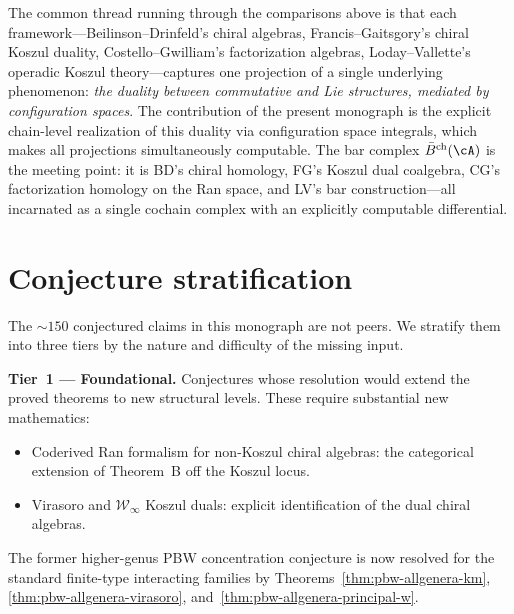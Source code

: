\begin{remark}[Synthesis]\label{rem:concordance-synthesis}
The common thread running through the comparisons above is that each
framework---Beilinson--Drinfeld's chiral algebras, Francis--Gaitsgory's
chiral Koszul duality, Costello--Gwilliam's factorization algebras,
Loday--Vallette's operadic Koszul theory---captures one projection of a
single underlying phenomenon: \emph{the duality between commutative and
Lie structures, mediated by configuration spaces}.  The contribution of
the present monograph is the explicit chain-level realization of this
duality via configuration space integrals, which makes all projections
simultaneously computable.  The bar complex $\bar{B}^{\mathrm{ch}}(\cA)$
is the meeting point: it is BD's chiral homology, FG's Koszul dual
coalgebra, CG's factorization homology on the Ran space, and LV's bar
construction---all incarnated as a single cochain complex with an
explicitly computable differential.
\end{remark}

\section{Conjecture stratification}
\label{sec:conjecture-stratification}

The ${\sim}150$ conjectured claims in this monograph are not peers.
We stratify them into three tiers by the nature and difficulty of
the missing input.

\smallskip\noindent\textbf{Tier~1 --- Foundational.}
Conjectures whose resolution would extend the proved theorems
to new structural levels.  These require substantial new
mathematics:
\begin{itemize}
\item Coderived Ran formalism for non-Koszul chiral algebras:
  the categorical extension of Theorem~B off the Koszul locus.
\item Virasoro and $\mathcal{W}_{\infty}$ Koszul duals: explicit
  identification of the dual chiral algebras.
\end{itemize}

\smallskip
\noindent
The former higher-genus PBW concentration conjecture is now resolved
for the standard finite-type interacting families by
Theorems~\ref{thm:pbw-allgenera-km},
\ref{thm:pbw-allgenera-virasoro},
and~\ref{thm:pbw-allgenera-principal-w}.

